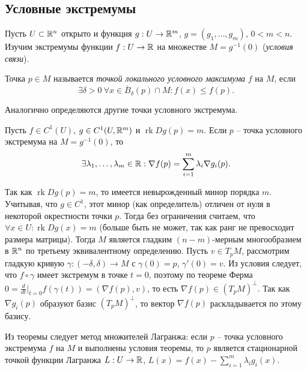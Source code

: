 
\subsection{Условные экстремумы}

Пусть $U \subset \mathbb{R}^n$ открыто и функция $g : U \to \mathbb{R}^m$, $g = (g_1, \dotsc, g_m)$, $0 < m < n$. 
Изучим экстремумы функции $f : U \to \mathbb{R}$ на множестве $M = g^{-1}(0)$ (\textit{условия связи}).

\begin{definition}
	Точка $p \in M$ называется \textit{точкой локального условного максимума} $f$ на $M$, если 
	\[ \exists \delta > 0 \ \forall x \in \mathring{B_{\delta}}(p) \cap M : f(x) \leq f(p). \]
\end{definition}

Аналогично определяются другие точки условного экстремума.

\begin{theorem}
	Пусть $f \in C^1(U)$, $g \in C^1(U, \mathbb{R}^m)$ и $\operatorname{rk} Dg(p) = m$. 
	Если $p$ -- точка условного экстремума на $M = g^{-1}(0)$, то 
	\[ \exists \lambda_1, \dotsc, \lambda_m \in \mathbb{R} : \nabla f(p) = \sum \limits_{i = 1}^{m} \lambda_i \nabla g_i (p). \]
\end{theorem}

\begin{myproof}
	Так как $\operatorname{rk} Dg(p) = m$, то имеется невырожденный минор порядка $m$. 
	Учитывая, что $g \in C^1$, этот минор (как определитель) отличен от нуля в некоторой окрестности точки $p$. 
	Тогда без ограничения считаем, что $\forall x \in U : \operatorname{rk} Dg(x) = m$ (больше быть не может, так как ранг не превосходит размера матрицы). 
	Тогда $M$ является гладким $(n-m)$-мерным многообразием в $\mathbb{R}^n$ по третьему эквивалентному определению.
	Пусть $v \in T_p M$, рассмотрим гладкую кривую $\gamma : (-\delta, \delta) \to M$ с $\gamma(0) = p$, $\gamma'(0) = v$. 
	Из условия следует, что $f \circ \gamma$ имеет экстремум в точке $t = 0$, поэтому по теореме Ферма $0 = \frac{d}{dt} \big|_{t = 0} f(\gamma(t)) = (\nabla f(p), v)$, 
	то есть $\nabla f(p) \in (T_p M)^{\perp}$. 
	Так как $\nabla g_i (p)$ образуют базис $(T_p M)^{\perp}$, то вектор $\nabla f(p)$ раскладывается по этому базису.
\end{myproof}


\begin{note}
	Из теоремы следует метод множителей Лагранжа: если $p$ -- точка условного экстремума $f$ на $M$ и выполнены условия теоремы, то 
	$p$ является стационарной точкой функции Лагранжа $L : U \to \mathbb{R}$, $L(x) = f(x) - \sum \limits_{i=1}^{m} \lambda_i g_i(x)$.
\end{note}

